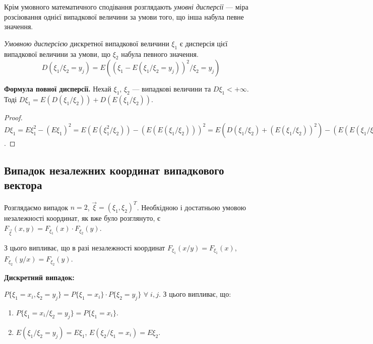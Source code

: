 Крім умовного математичного сподівання розглядають
\emph{умовні дисперсії} --- міра розсіювання однієї випадкової величини 
за умови того, що інша набула певне значення.

\begin{definition}
    \emph{Умовною дисперсією} дискретної випадкової величини $\xi_1$ 
    є дисперсія цієї випадкової величини за умови, що 
    $\xi_2$ набула певного значення.
    $$D(\xi_1 / \xi_2 = y_j) = 
    E((\xi_1 - E(\xi_1 / \xi_2 = y_j))^2/\xi_2 = y_j)$$
\end{definition}

\noindent\textbf{Формула повної дисперсії.}
    Нехай $\xi_1$, $\xi_2$ --- випадкові величини та $D\xi_1 < +\infty$. 
    Тоді
    $D\xi_1 = E(D(\xi_1/\xi_2)) + D(E(\xi_1 / \xi_2))$.

\begin{proof}
    $D\xi_1 = E\xi_1^2 - (E \xi_1)^2 = 
    E(E(\xi_1^2 / \xi_2)) - (E(E(\xi_1/\xi_2)))^2 = 
    E(D(\xi_1/\xi_2) + (E(\xi_1/\xi_2))^2) - (E(E(\xi_1/\xi_2)))^2 = 
    E(D(\xi_1 / \xi_2)) + (E(E(\xi_1/\xi_2)^2) - 
    (E(E(\xi_1 / \xi_2)))^2) = E(D(\xi_1/\xi_2)) + D(E(\xi_1/\xi_2))$.
\end{proof}



\subsection{Випадок незалежних координат випадкового вектора}

Розглядаємо випадок $n=2$, $\vec{\xi} = \left(\xi_1, \xi_2\right)^T$.
Необхідною і достатньою умовою незалежності координат, як вже було розглянуто, є 
$F_{\vec{\xi}}(x, y) = F_{\xi_1}(x)\cdot F_{\xi_2}(y)$.

З цього випливає, що в разі незалежності координат $F_{\xi_1}(x/y) = F_{\xi_1}(x)$, 
$F_{\xi_2}(y/x) = F_{\xi_2}(y)$.

\noindent\textbf{Дискретний випадок: }

$P\{\xi_1 = x_i, \xi_2 = y_j\} = P\{\xi_1 = x_i\}\cdot P\{\xi_2 = y_j\}$ 
$\forall \; i,j$.
З цього випливає, що:

\begin{enumerate}
    \item $P\{\xi_1 = x_i / \xi_2 = y_j\} = 
    P\{\xi_1 = x_i\}$.
    \item $E(\xi_1 / \xi_2 = y_j) = E\xi_1$,
    $E(\xi_2 / \xi_1 = x_i) = E\xi_2$.
\end{enumerate}

